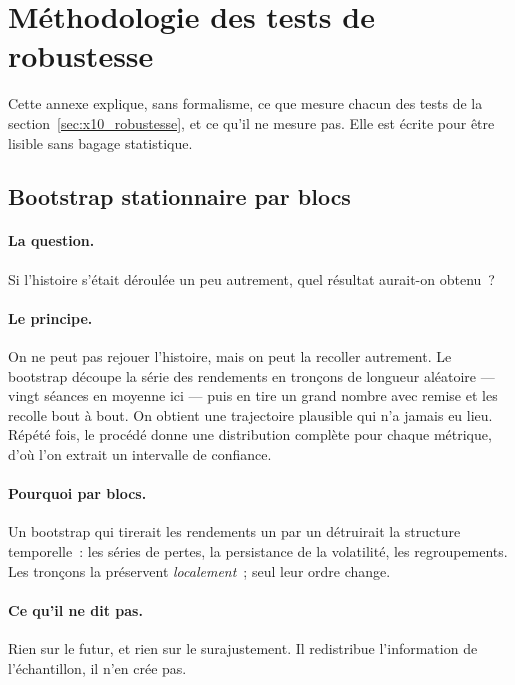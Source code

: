 \section{Méthodologie des tests de robustesse}
\label{app:x10_methodologie_robustesse}

Cette annexe explique, sans formalisme, ce que mesure chacun des tests de la
section~\ref{sec:x10_robustesse}, et ce qu'il ne mesure pas. Elle est écrite
pour être lisible sans bagage statistique.

\subsection{Bootstrap stationnaire par blocs}

\paragraph{La question.} Si l'histoire s'était déroulée un peu autrement,
quel résultat aurait-on obtenu~?

\paragraph{Le principe.} On ne peut pas rejouer l'histoire, mais on peut la
recoller autrement. Le bootstrap découpe la série des rendements en tronçons
de longueur aléatoire --- vingt séances en moyenne ici --- puis en tire un
grand nombre avec remise et les recolle bout à bout. On obtient une
trajectoire plausible qui n'a jamais eu lieu. Répété
\XTenBootReplicates{} fois, le procédé donne une distribution complète pour
chaque métrique, d'où l'on extrait un intervalle de confiance.

\paragraph{Pourquoi par blocs.} Un bootstrap qui tirerait les rendements un
par un détruirait la structure temporelle~: les séries de pertes, la
persistance de la volatilité, les regroupements. Les tronçons la préservent
\emph{localement}~; seul leur ordre change.

\paragraph{Ce qu'il ne dit pas.} Rien sur le futur, et rien sur le
surajustement. Il redistribue l'information de l'échantillon, il n'en crée
pas.

